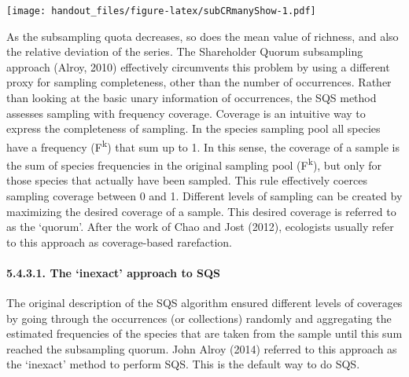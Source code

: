 \documentclass[]{article}
\let\oldparagraph\paragraph
\renewcommand{\paragraph}[1]{\oldparagraph{#1}\mbox{}}
\begin{document}
\texttt{[image: handout\_files/figure-latex/subCRmanyShow-1.pdf]}

As the subsampling quota decreases, so does the mean value of richness,
and also the relative deviation of the series. The Shareholder Quorum
subsampling approach (Alroy, 2010) effectively circumvents this problem
by using a different proxy for sampling completeness, other than the
number of occurrences. Rather than looking at the basic unary
information of occurrences, the SQS method assesses sampling with
frequency coverage. Coverage is an intuitive way to express the
completeness of sampling. In the species sampling pool all species have
a frequency (F\textsuperscript{k}) that sum up to 1. In this sense, the
coverage of a sample is the sum of species frequencies in the original
sampling pool (F\textsuperscript{k}), but only for those species that
actually have been sampled. This rule effectively coerces sampling
coverage between 0 and 1. Different levels of sampling can be created by
maximizing the desired coverage of a sample. This desired coverage is
referred to as the `quorum'. After the work of Chao and Jost (2012),
ecologists usually refer to this approach as coverage-based rarefaction.

\paragraph{\texorpdfstring{5.4.3.1. The `inexact' approach to
SQS}{5.4.3.1. The inexact approach to SQS}}\label{the-inexact-approach-to-sqs}

The original description of the SQS algorithm ensured different levels
of coverages by going through the occurrences (or collections) randomly
and aggregating the estimated frequencies of the species that are taken
from the sample until this sum reached the subsampling quorum. John
Alroy (2014) referred to this approach as the `inexact' method to
perform SQS. This is the default way to do SQS.
\end{document}
